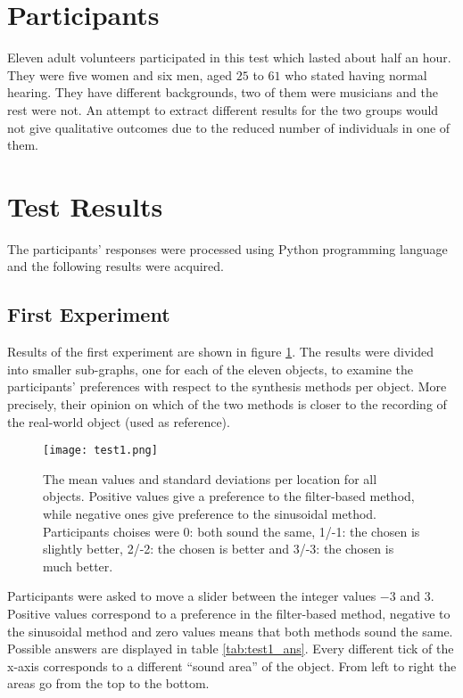 \section{Participants}
Eleven adult volunteers participated in this test which lasted about half an hour. They were five women and six men, aged $25$ to $61$ who stated having normal hearing. They have different backgrounds, two of them were musicians and the rest were not. An attempt to extract different results for the two groups would not give qualitative outcomes due to the reduced number of individuals in one of them.

\section{Test Results}
The participants' responses were processed using Python programming language and the following results were acquired.

\subsection{First Experiment}
Results of the first experiment are shown in figure \ref{fig:test1}. The results were divided into smaller sub-graphs, one for each of the eleven objects, to examine the participants' preferences with respect to the synthesis methods per object. More precisely, their opinion on which of the two methods is closer to the recording of the real-world object (used as reference).

\begin{figure}[H]
  \centering
    \texttt{[image: test1.png]}
      \caption{The mean values and standard deviations per location for all objects. Positive values give a preference to the filter-based method, while negative ones give preference to the sinusoidal method. Participants choises were 0: both sound the same, 1/-1: the chosen is slightly better, 2/-2: the chosen is better and 3/-3: the chosen is much better.}\label{fig:test1}
\end{figure}

Participants were asked to move a slider between the integer values $-3$ and $3$. Positive values correspond to a preference in the filter-based method, negative to the sinusoidal method and zero values means that both methods sound the same. Possible answers are displayed in table \ref{tab:test1_ans}. Every different tick of the x-axis corresponds to a different ``sound area'' of the object. From left to right the areas go from the top to the bottom.

